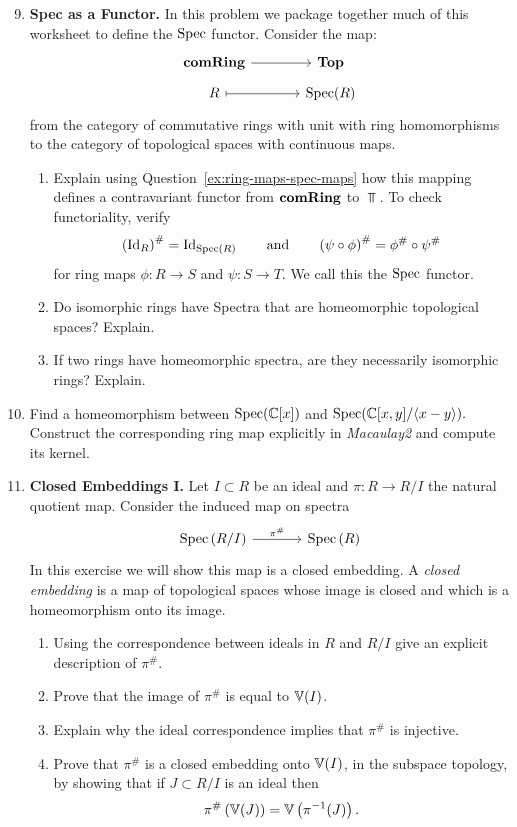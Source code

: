 \documentclass[12pt,reqno]{amsart}
\begin{document}
\begin{enumerate}[leftmargin=*]
 \setcounter{enumi}{8}
\item \textbf{Spec as a Functor.} In this problem we package together much of this worksheet to define the $\operatorname{Spec}$ functor. Consider the map:
\[
\begin{tikzcd}[row sep  = .5em, column sep = 3.5em]
\comRing \arrow[r] & \Top \\
R \arrow[r, mapsto] & \Spec(R)
\end{tikzcd}
\]
from the category of commutative rings with unit with ring homomorphisms to the category of topological spaces with continuous maps. 
 \begin{enumerate}[label=(\alph*),ref=\theenumi\alph*]
	 \item Explain using Question~\ref{ex:ring-maps-spec-maps} how this mapping defines a contravariant functor from $\operatorname{\textbf{comRing}}$ to $\Top$. To check functoriality, verify 
	 \[
	 \left(\operatorname{Id}_{R}\right)^{\#} = \operatorname{Id}_{\operatorname{Spec}(R)} \quad \quad \text{and} \quad \quad \left(\psi \circ \phi\right)^{\#} = \phi^{\#} \circ \psi^{\#}
	 \]
	 for ring maps $\phi:R\to S$ and $\psi:S\to T$.   We call this the $\operatorname{Spec}$ functor.
	 \item Do isomorphic rings have Spectra that are homeomorphic topological spaces? Explain.
	 \item If two rings have homeomorphic spectra, are they necessarily isomorphic rings? Explain.
\end{enumerate}

\item Find a homeomorphism between  $\operatorname{Spec}(\mathbb{C}[x])$ and  $\operatorname{Spec}(\mathbb{C}[x,y] /\langle x-y \rangle).$ Construct the corresponding ring map explicitly in \textit{Macaulay2} and compute its kernel.

\item \textbf{Closed Embeddings I.}  Let $I \subset R$ be an ideal and $\pi: R \to R/I$ the natural quotient map. Consider the induced map on spectra
\[
\begin{tikzcd}[row sep = .5em, column sep = 3.5em]
\Spec\left(R/I\right) \arrow[r, "\pi^{\#}"] & \Spec\left(R\right) 
\end{tikzcd}
\]
In this exercise we will show this map is a closed embedding. A \emph{closed embedding} is a map of topological spaces whose image is closed and which is a homeomorphism onto its image.
\begin{enumerate}[label=(\alph*),ref=\theenumi\alph*]
	\item Using the correspondence between ideals in $R$ and $R/I$ give an explicit description of $\pi^{\#}$.
	\item Prove that the image of $\pi^{\#}$ is equal to $\mathbb{V}(I)$. 
	\item Explain why the ideal correspondence implies that $\pi^{\#}$ is injective. 
	\item Prove that $\pi^{\#}$ is a closed embedding onto $\mathbb{V}(I)$, in the subspace topology, by showing that if $J \subset R/I$ is an ideal then
	\[
	\pi^{\#}\left(\mathbb{V}(J)\right) = \mathbb{V}\left(\pi^{-1}(J)\right). 
	\]
\end{enumerate}

\end{enumerate}
\end{document}
